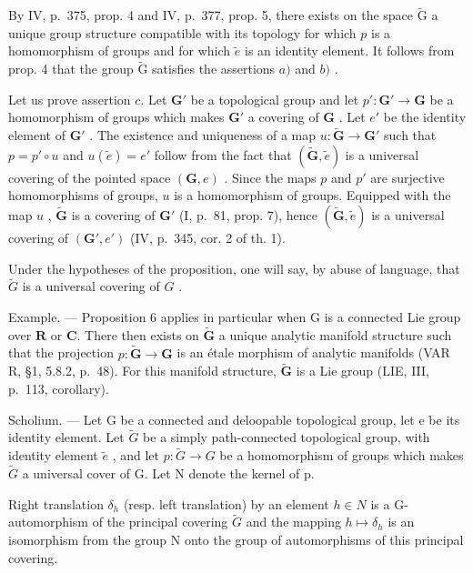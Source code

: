 By IV, p.~375, prop. 4 and IV, p.~377, prop. 5, there exists on the space \(\widetilde{\mathrm{G}}\) a unique group structure compatible with its topology for which \(p\) is a homomorphism of groups and for which \(\widetilde{e}\) is an identity element. It follows from prop. 4 that the group \(\widetilde{\mathrm{G}}\) satisfies the assertions \(a)\) and \(b)\) .

Let us prove assertion \(c\). Let \(\mathbf{G}'\) be a topological group and let \(p'\colon \mathbf{G}' \to \mathbf{G}\) be a homomorphism of groups which makes \(\mathbf{G}'\) a covering of \(\mathbf{G}\) . Let \(e'\) be the identity element of \(\mathbf{G}'\) . The existence and uniqueness of a map \(u\colon \widetilde{\mathbf{G}} \to \mathbf{G}'\) such that \(p = p' \circ u\) and \(u(\widetilde{e}) = e'\) follow from the fact that \((\widetilde{\mathbf{G}}, \widetilde{e})\) is a universal covering of the pointed space \((\mathbf{G}, e)\) . Since the maps \(p\) and \(p'\) are surjective homomorphisms of groups, \(u\) is a homomorphism of groups. Equipped with the map \(u\) , \(\widetilde{\mathbf{G}}\) is a covering of \(\mathbf{G}'\) (I, p.~81, prop. 7), hence \((\widetilde{\mathbf{G}}, \widetilde{e})\) is a universal covering of \((\mathbf{G}', e')\) (IV, p.~345, cor. 2 of th. 1).

Under the hypotheses of the proposition, one will say, by abuse of language, that \(\tilde{G}\) is a universal covering of \(G\) .

Example. --- Proposition 6 applies in particular when G is a connected Lie group over \(\mathbf{R}\) or \(\mathbf{C}\). There then exists on \(\widetilde{\mathbf{G}}\) a unique analytic manifold structure such that the projection \(p\colon\widetilde{\mathbf{G}}\to\mathbf{G}\) is an étale morphism of analytic manifolds (VAR R, §1, 5.8.2, p.~48). For this manifold structure, \(\widetilde{\mathbf{G}}\) is a Lie group (LIE, III, p.~113, corollary).

Scholium. --- Let G be a connected and deloopable topological group, let e be its identity element. Let \(\widetilde{G}\) be a simply path-connected topological group, with identity element \(\widetilde{e}\) , and let \(p\colon\widetilde{G}\to G\) be a homomorphism of groups which makes \(\widetilde{G}\) a universal cover of G. Let N denote the kernel of p.

Right translation \(\delta_{h}\) (resp. left translation) by an element \(h \in N\) is a G-automorphism of the principal covering \(\widetilde{G}\) and the mapping \(h \mapsto \delta_{h}\) is an isomorphism from the group N onto the group of automorphisms of this principal covering.

